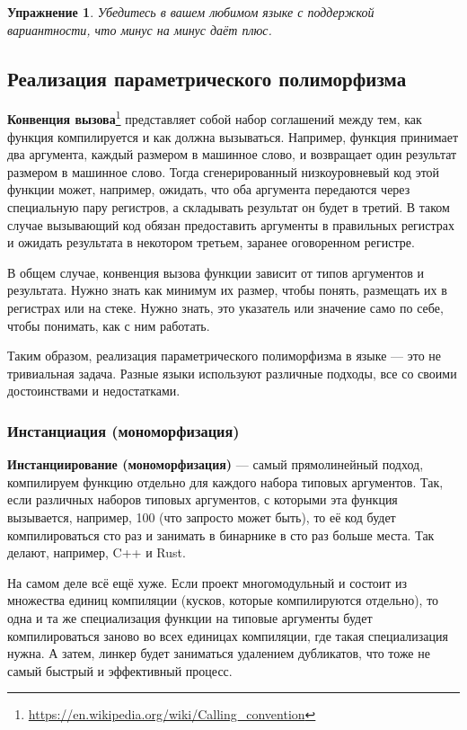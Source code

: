 \documentclass[12pt]{article}
\newcommand{\vocab}[1]{\textbf{#1}} %
\newtheorem{task}{Упражнение}
\begin{document}
    \begin{task}
        Убедитесь в вашем любимом языке с поддержкой вариантности, что минус на минус даёт плюс.
    \end{task}

    \subsection{Реализация параметрического полиморфизма}

    \vocab{Конвенция вызова}\footnote{\url{https://en.wikipedia.org/wiki/Calling_convention}} представляет собой набор соглашений между тем, как функция компилируется и как должна вызываться.
    Например, функция принимает два аргумента, каждый размером в машинное слово, и возвращает один результат размером в машинное слово.
    Тогда сгенерированный низкоуровневый код этой функции может, например, ожидать, что оба аргумента передаются через специальную пару регистров, а складывать результат он будет в третий.
    В таком случае вызывающий код обязан предоставить аргументы в правильных регистрах и ожидать результата в некотором третьем, заранее оговоренном регистре.

    В общем случае, конвенция вызова функции зависит от типов аргументов и результата.
    Нужно знать как минимум их размер, чтобы понять, размещать их в регистрах или на стеке.
    Нужно знать, это указатель или значение само по себе, чтобы понимать, как с ним работать.

    Таким образом, реализация параметрического полиморфизма в языке --- это не тривиальная задача.
    Разные языки используют различные подходы, все со своими достоинствами и недостатками.

    \subsubsection{Инстанциация (мономорфизация)}

    \vocab{Инстанциирование (мономорфизация)} --- самый прямолинейный подход, компилируем функцию отдельно для каждого набора типовых аргументов.
    Так, если различных наборов типовых аргументов, с которыми эта функция вызывается, например, 100 (что запросто может быть), то её код будет компилироваться сто раз и занимать в бинарнике в сто раз больше места.
    Так делают, например, C++ и Rust.

    На самом деле всё ещё хуже.
    Если проект многомодульный и состоит из множества единиц компиляции (кусков, которые компилируются отдельно), то одна и та же специализация функции на типовые аргументы будет компилироваться заново во всех единицах компиляции, где такая специализация нужна.
    А затем, линкер будет заниматься удалением дубликатов, что тоже не самый быстрый и эффективный процесс.
\end{document}
